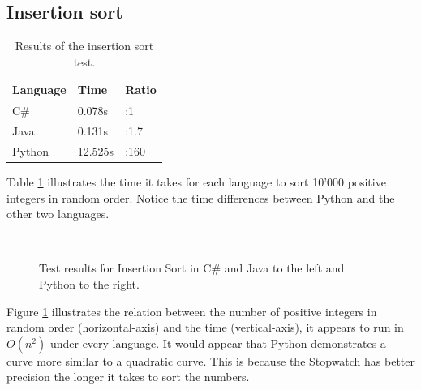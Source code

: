 \subsection{Insertion sort}

\begin{table}[h]
	\begin{center}
		\begin{tabular} { >{\centering\arraybackslash}m{3cm} | >{\centering\arraybackslash}m{2cm} | >{\centering\arraybackslash}m{2cm} }
			\hline
			\textbf{Language}	& \textbf{Time} & \textbf{Ratio} \\ \hline
			C\#					& 0.078s 		& 1:1 \\ \hline
			Java				& 0.131s 		& 1:1.7 \\ \hline
			Python				& 12.525s 		& 1:160 \\  \hline		
		\end{tabular}
	\end{center}
	\caption{Results of the insertion sort test.}
	\label{table:insertion_sort}
\end{table}

Table \ref{table:insertion_sort} illustrates the time it takes for each language to sort 10'000 positive integers in random order. Notice the time differences between Python and the other two languages.

\begin{figure}[h]
	\centering
	\mbox{
	}
	\caption{Test results for Insertion Sort in C\# and Java to the left and Python to the right.}
	\label{fig:insertion_sort_results}
\end{figure}

Figure \ref{fig:insertion_sort_results} illustrates the relation between the number of positive integers in random order (horizontal-axis) and the time (vertical-axis), it appears to run in $O(n^2)$ under every language. It would appear that Python demonstrates a curve more similar to a quadratic curve. This is because the Stopwatch has better precision the longer it takes to sort the numbers.